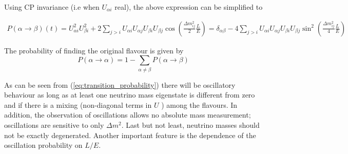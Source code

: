 Using \textsc{CP} invariance (i.e when \(U_{\alpha i}\) real), the above expression can be simplified to
\begin{widetext}
    \begin{eqnarray}
        P(\alpha \to \beta)(t) 
        = U^2_{\alpha i}U_{\beta i}^2 
        + 2 \sum_{j > i} U_{\alpha i}U _{\alpha j}U_{\beta i}U _{\beta j} \cos{\left( \frac{\Delta m_{ij}^2}{2} \frac{L}{E}\right)}
        = \delta _{\alpha\beta} - 4 \sum_{j > i} U_{\alpha i}U _{\alpha j}U_{\beta i}U _{\beta j} \sin^2 {\left( \frac{\Delta m_{ij}^2}{4} \frac{L}{E}\right)}
\end{eqnarray}
\end{widetext}

The probability of finding the original flavour is given by
\begin{equation}
    P(\alpha \to \alpha) = 1 - \sum _{\alpha \not = \beta} P(\alpha \to \beta)
\end{equation}

As can be seen from (\ref{eq:transition_probability}) there will be oscillatory behaviour as long as at least one neutrino mass eigenstate is different from zero and if there is a mixing (non-diagonal terms in \(U\) ) among the flavours. In addition, the observation of oscillations allows no absolute mass measurement; oscillations are sensitive to only \(\Delta m^2\). Last but not least, neutrino masses should not be exactly degenerated. Another important feature is the dependence of the oscillation probability on $L/E$.

